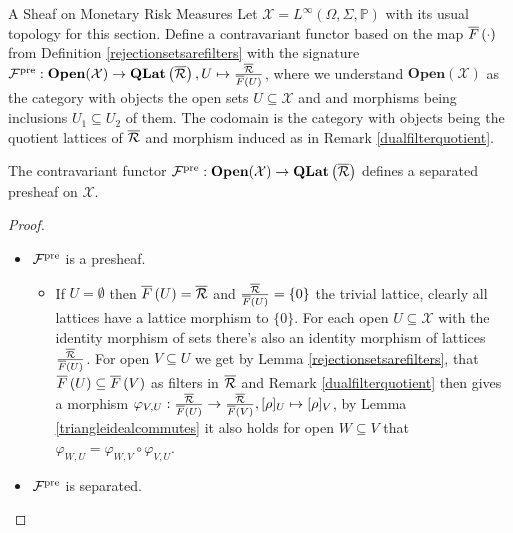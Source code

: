 \begin{subsection}{A Sheaf on Monetary Risk Measures}
    Let \( \mathcal{X} = L^\infty(\Omega, \Sigma, \mathbb{P}) \) with its usual topology for this section.
    Define a contravariant functor based on the map \( \overline{F}\left (\cdot \right) \) from Definition \ref{rejectionsetsarefilters}
    with the signature \( \mathcal{F}^{\text{pre}} :\textbf{Open}(\mathcal{X}) \to \textbf{QLat}\left (\overline{\mathcal{R}} \right), U \mapsto \frac{\overline{\mathcal{R}}}{\overline{F}\left (U \right)} \), where we understand 
    \( \textbf{Open}(\mathcal{X}) \) as the category with objects the open sets \( U \subseteq \mathcal{X} \) and 
    and morphisms being inclusions \( U_1 \subseteq U_2 \) of them. The codomain is the category with objects being the quotient lattices of \( \overline{\mathcal{R}} \)
    and morphism induced as in Remark \ref{dualfilterquotient}.
    \begin{theorem} \label{rmpresheaf}
        The contravariant functor \( \mathcal{F}^{\text{pre}} : \textbf{Open}(\mathcal{X}) \to \textbf{QLat}\left (\overline{\mathcal{R}} \right) \) defines a separated presheaf on
        \( \mathcal{X} \).
    \end{theorem}
    \begin{proof}
        \begin{itemize}
            \item \( \mathcal{F}^{\text{pre}} \) is a presheaf.
                \begin{itemize}
                    \item
                        If \( U = \emptyset \) then \( \overline{F}\left (U \right) = \overline{\mathcal{R}} \) and \( \frac{\overline{\mathcal{R}}}{\overline{F}\left (U \right)} = \{0\} \) the trivial lattice, clearly all lattices have a lattice morphism 
                        to \( \{0\} \).
                        For each open \( U \subseteq \mathcal{X} \) with the identity morphism of sets there's also an identity morphism of lattices \( \frac{\overline{\mathcal{R}}}{\overline{F}\left (U \right)} \).
                        For open \( V \subseteq U \) we get by Lemma \ref{rejectionsetsarefilters}, that \( \overline{F}\left (U \right) \subseteq  \overline{F}\left (V \right) \) as filters in \( \overline{\mathcal{R}} \)
                        and Remark \ref{dualfilterquotient} then gives a morphism \( \varphi_{V,U} : \frac{\overline{\mathcal{R}}}{\overline{F}\left (U \right)} \to \frac{\overline{\mathcal{R}}}{\overline{F}\left (V \right)}, [\rho]_U \mapsto [\rho]_V \),
                        by Lemma \ref{triangleidealcommutes} it also holds for open \( W \subseteq V \) that \( \varphi_{W,U} = \varphi_{W,V} \circ \varphi_{V,U} \).
                \end{itemize}
            \item \( \mathcal{F}^{\text{pre}} \) is separated.
                \begin{itemize}

\end{itemize}
\end{itemize}
\end{proof}
\end{subsection}
